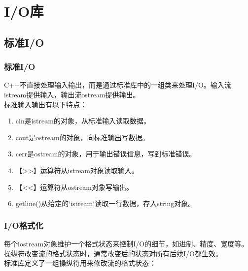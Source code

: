 \chapter{I/O库}

\section{标准I/O}

\subsection{标准I/O}

C++不直接处理输入输出，而是通过标准库中的一组类来处理I/O。输入流istream提供输入，输出流ostream提供输出。 \\

标准输入输出有以下特点：

\begin{enumerate}
	\item cin是istream的对象，从标准输入读取数据。
	\item cout是ostream的对象，向标准输出写数据。
	\item cerr是ostream的对象，用于输出错误信息，写到标准错误。
	\item 【>>】运算符从istream对象读取输入。
	\item 【<<】运算符从ostream对象写输出。
	\item getline()从给定的`istream`读取一行数据，存入string对象。
\end{enumerate}

\subsection{I/O格式化}

每个iostream对象维护一个格式状态来控制I/O的细节，如进制、精度、宽度等。操纵符改变流的格式状态时，通常改变后的状态对所有后续I/O都生效。 \\

标准库定义了一组操纵符用来修改流的格式状态：

